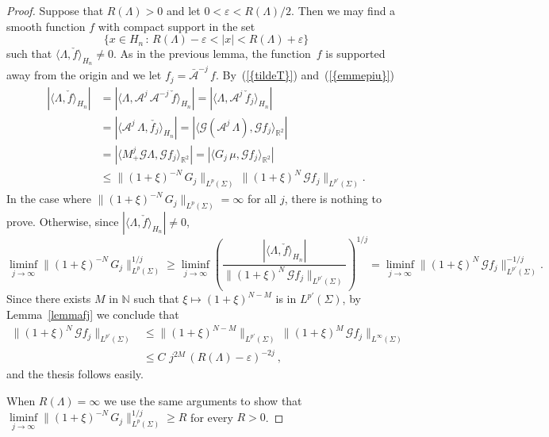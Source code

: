 \documentclass[12pt,a4paper]{amsart}
\theoremstyle{plain}
\theoremstyle{definition}
\numberwithin{equation}{section}
\begin{document}
 
\begin{proof}
Suppose that $R(\Lambda)>0$ and let $0<{\varepsilon}<R(\Lambda)/2$.
Then  
we may find a smooth function
$f$ with compact support in the set
$$
\{x\in {{H_{n}}}\, :\, R(\Lambda)-{\varepsilon}<|x|< R(\Lambda)+{\varepsilon} \}
$$
 such that
${\langle {\Lambda},{\check f} \rangle_{{H_{n}}}}\neq 0$.
As in the previous lemma, 
the function~$f$ is supported away from the origin and we let
$f_j= \bar{\mathcal A}^{-j}\,f$.
By{~(\ref{{tildeT}})}  and{~(\ref{{emmepiu}})}
\begin{align*}
|{\langle {\Lambda},{\check f} \rangle_{{H_{n}}}}|
&=|{\langle {\Lambda},{ {\mathcal A}^{j}\, {\mathcal A}^{-j}\,\check f} \rangle_{{H_{n}}}}|
=|{\langle {\Lambda},{ {\mathcal A}^{j}\,\check f_j} \rangle_{{H_{n}}}}|
\\
&=|{\langle {{\mathcal A}^{j}\,\Lambda},{\check{f_j}} \rangle_{{H_{n}}}}|
=|{\langle {{\mathcal G}{({\mathcal A}^{j}\,\Lambda)}},{{\mathcal G}{ {f_j}}} \rangle_{{\mathbb R}^2}}|
\\
&=|{\langle {M_+^{j} {\mathcal G}{\Lambda}},{{\mathcal G}{ {f_j}}} \rangle_{{\mathbb R}^2}}|
=|{\langle {G_j\, \mu},{{\mathcal G}{ {f_j}}} \rangle_{{\mathbb R}^2}}|
\\
&\leq 
\| (1+\xi)^{-N}\,G_j\|_{L^p({\Sigma})}\,
\|(1+\xi)^{N}\,{\mathcal G}{ f_j}\|_{L^{p'}({\Sigma})}.
\end{align*}
 In the case where $\| (1+\xi)^{-N}\,G_j\|_{L^p({\Sigma})}=\infty$ for all $j$,
 there is nothing to prove. Otherwise, since $|{\langle {\Lambda},{\check{f}} \rangle_{{H_{n}}}}|\neq0$,
$$
\liminf_{j\to\infty}
\| (1+\xi)^{-N}\,G_j \|_{L^p({\Sigma})}^{1/j}
\geq \liminf_{j\to\infty}
\left(\frac{|{\langle {\Lambda},{\check{f}} \rangle_{{H_{n}}}}|}{\|(1+\xi)^{N}\,{\mathcal G}{{f_j}}\|_{L^{p'}({\Sigma})}}
\right)^{1/j}
\!= \liminf_{j\to\infty}\|(1+\xi)^{N}\,{\mathcal G}{f_j}\|_{L^{p'}({\Sigma})}^{-1/j}.
$$
Since there exists $M$ in ${\mathbb N}$ such that
$\xi\mapsto (1+\xi)^{N-M}$ is in $L^{p'}({\Sigma})$, by Lemma~\ref{lemmafj}
we conclude that
\begin{align*}
\|(1+\xi)^{N}\,{\mathcal G}{f_j}\|_{L^{p'}({\Sigma})}
&\leq 
\|(1+\xi)^{N-M}\|_{L^{p'}({\Sigma})}\,
\|
(1+\xi)^{M}\,
{\mathcal G}{f_j}
\|_{{L^{\infty}({\Sigma})}}
\\
&
\leq C\,\,j^{2M}\,(R(\Lambda)-{\varepsilon})^{-2j}\ ,
\end{align*}
and the thesis follows easily.

When $R(\Lambda)=\infty$ we use the same arguments to show that \hbox{$\liminf\limits_{j\to\infty}
\| (1+\xi)^{-N}\,G_j \|_{L^p({\Sigma})}^{1/j}\geq R$} for every $R>0$.
\end{proof}
\end{document}
